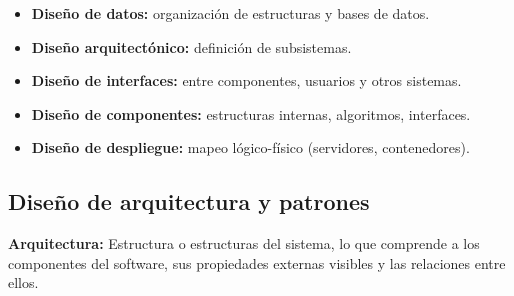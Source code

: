 \begin{itemize}
    \item \textbf{Diseño de datos:} organización de estructuras y bases de datos.
    \item \textbf{Diseño arquitectónico:} definición de subsistemas.
    \item \textbf{Diseño de interfaces:} entre componentes, usuarios y otros sistemas.
    \item \textbf{Diseño de componentes:} estructuras internas, algoritmos, interfaces.
    \item \textbf{Diseño de despliegue:} mapeo lógico-físico (servidores, contenedores).
\end{itemize}

\subsection{Diseño de arquitectura y patrones}\label{subsec:diseno-de-arquitectura-y-patrones}

\begin{definicion}
    \textbf{Arquitectura:}
    Estructura o estructuras del sistema, lo que comprende a los
    componentes del software, sus propiedades externas visibles y las
    relaciones entre ellos.
\end{definicion}

